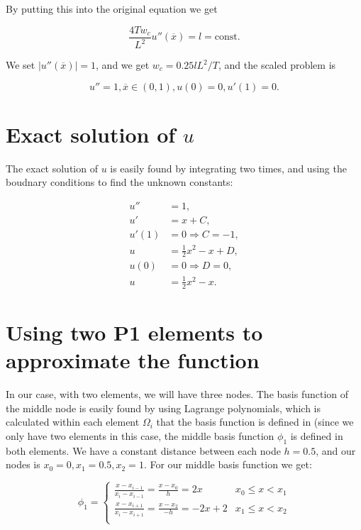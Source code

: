 \documentclass[10pt, a4paper]{amsart}
\numberwithin{figure}{section}
\numberwithin{table}{section}
\begin{document}
By putting this into the original equation we get

\begin{equation}
    \frac{4T w_c}{L^2} u''(\overline{x}) = l = \text{const}. 
\end{equation}

    We set $|u''(\overline{x})|= 1$, and we get $w_c = 0.25lL^2/T$, and the scaled problem is

    \begin{equation}
        u'' = 1, \overline{x} \in (0,1), u(0) = 0, u'(1) = 0.
    \end{equation}


\section{Exact solution of $u$}

The exact solution of $u$ is easily found by integrating two times, and using
the boudnary conditions to find the unknown constants:

\begin{align}
    u'' &= 1,\\
    u' &= x + C,\\
    u'(1) &= 0 \Rightarrow C = -1,\\
    u &= \frac{1}{2}x^2 -x + D,\\
    u(0) &= 0 \Rightarrow D = 0,\\
    u &= \frac{1}{2}x^2 - x.
\end{align}

\section{Using two P1 elements to approximate the function}

In our case, with two elements, we will have three nodes. The basis function of
the middle node is easily found by using Lagrange polynomials, which is
calculated within each element $\Omega_i$ that the basis function is defined in
(since we only have two elements in this case, the middle basis function
$\phi_1$ is defined in both elements. We have a constant distance between each
node $h = 0.5$, and our nodes is $x_0 = 0, x_1 = 0.5, x_2 = 1$. For our middle
basis function we get:

\[
    \phi_1 =
    \begin{cases}
        \frac{x - x_{i-1}}{x_i - x_{i-1}} = \frac{x - x_0}{h} = 2x & x_0 \leq x
        < x_1 \\
        \frac{x - x_{i+1}}{x_i - x_{i+1}} = \frac{x - x_2}{-h} = -2x + 2 & x_1
        \leq x < x_2 \\
    \end{cases}
\]

\end{document}

